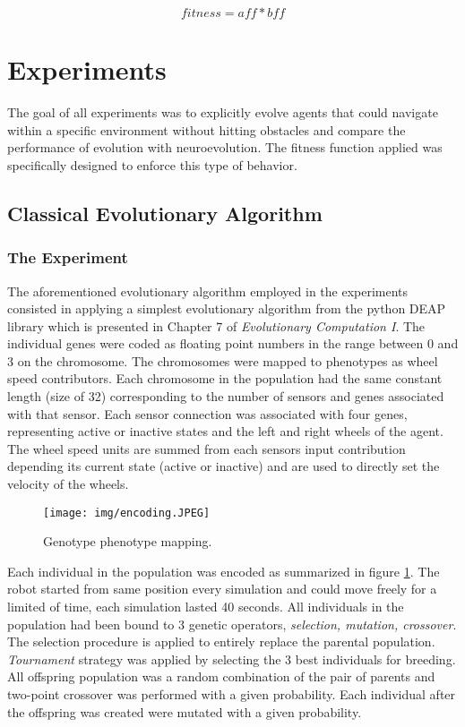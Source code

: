 \documentclass[format=acmsmall, review=false, screen=true]{acmart}
\begin{document}
\[ fitness = aff * bff \]

\section{Experiments}

The goal of all experiments was to explicitly evolve agents that could navigate within a specific environment without hitting obstacles and compare the performance of evolution with neuroevolution. The fitness function applied was specifically designed to enforce this type of behavior.

\subsection{Classical Evolutionary Algorithm}

\subsubsection{The Experiment}

The aforementioned evolutionary algorithm employed in the experiments consisted in applying a simplest evolutionary algorithm from the python DEAP library which is presented in Chapter 7 of \emph{Evolutionary Computation I}\cite{back2000evolutionary}. The individual genes were coded as floating point numbers in the range between 0 and 3 on the chromosome. The chromosomes were mapped to phenotypes as wheel speed contributors. Each chromosome in the population had the same constant length (size of 32) corresponding to the number of sensors and genes associated with that sensor. Each sensor connection was associated with four genes, representing active or inactive states and the left and right wheels of the agent. The wheel speed units are summed from each sensors input contribution depending its current state (active or inactive) and are used to directly set the velocity of the wheels.

\begin{figure}[H]
  \texttt{[image: img/encoding.JPEG]}
  \caption{Genotype phenotype mapping.}
  \label{fig:encoding}
\end{figure}

Each individual in the population was encoded as summarized in figure \ref{fig:encoding}. The robot started from same position every simulation and could move freely for a limited of time, each simulation lasted 40 seconds. All individuals in the population had been bound to 3 genetic operators, \emph{selection, mutation, crossover}. The selection procedure is applied to entirely replace the parental population. \emph{Tournament} strategy was applied by selecting the 3 best individuals for breeding. All offspring population was a random combination of the pair of parents and two-point crossover was performed with a given probability. Each individual after the offspring was created were mutated with a given probability.
\end{document}
